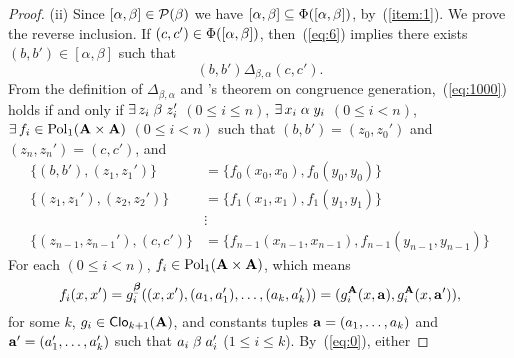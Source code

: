 \begin{proof}
\noindent (ii)
Since $[\alpha, \beta] \in \mathcal{P}(\beta)$
we have $[\alpha, \beta] \subseteq \Phi([\alpha, \beta])$,
by~(\ref{item:1}).
    We prove the reverse inclusion.
    If $(c,c')\in \Phi([\alpha, \beta])$, then~(\ref{eq:6})
    implies there exists $(b,b')\in [\alpha, \beta]$ such that
    \begin{equation}
      \label{eq:1000}
      (b,b') \mathrel{\Delta_{\beta, \alpha}} (c,c').
    \end{equation}
    From the definition of $\Delta_{\beta, \alpha}$ and 
    \malcev's theorem on congruence generation,~(\ref{eq:1000})
    holds if and only if
    $\exists \, z_i \mathrel{\beta} z_i'$ $(0\leq i \leq n)$,
    $\exists \, x_i \mathrel{\alpha} y_i$ $(0\leq i < n)$,
    $\exists\, f_i \in \operatorname{Pol}_1(\mathbf{A}\times \mathbf{A})$ $(0\leq i < n)$
    such that
    $(b, b') = (z_0,z_0')$ and
    $(z_n,z_n') = (c, c')$, and
    \begin{align}
      \label{eq:0}
      \{(b, b'),(z_1,z_1')\} &= \{f_0(x_0,x_0), f_0(y_0,y_0)\}\\
      \label{eq:1}
      \{(z_1,z_1'),(z_2,z_2')\} &= \{f_1(x_1,x_1), f_1(y_1,y_1)\}\\
      \nonumber
      & \vdots\\
      \nonumber
      \{(z_{n-1},z_{n-1}'),(c, c')\} &= \{f_{n-1}(x_{n-1},x_{n-1}), f_{n-1}(y_{n-1},y_{n-1})\}
    \end{align}
    For each $(0\leq i < n)$, $f_i \in \operatorname{Pol}_1(\mathbf{A}\times \mathbf{A})$, which means
    \newcommand\gA{\ensuremath{g^{\bA}}}%
    \[      f_i(x, x') = g_i^{\bbeta}((x, x'), (a_1, a_1'), \dots, (a_k, a_k') )
      = (g_i^{\bA}(x, \ba), g_i^{\bA}(x, \ba')),%
      \]%
    \renewcommand\gA{\ensuremath{g}}%
    for some $k$, $\gA_i \in \sansClo_{k+1}(\bA)$, and constants tuples
    $\mathbf{a} = (a_1, \dots, a_k)$ and $\mathbf{a}' = (a_1', \dots, a_k')$ such that
    $a_i \mathrel{\beta} a_i'$ ($1\leq i\leq k$). 
    By~(\ref{eq:0}), either

\end{proof}
